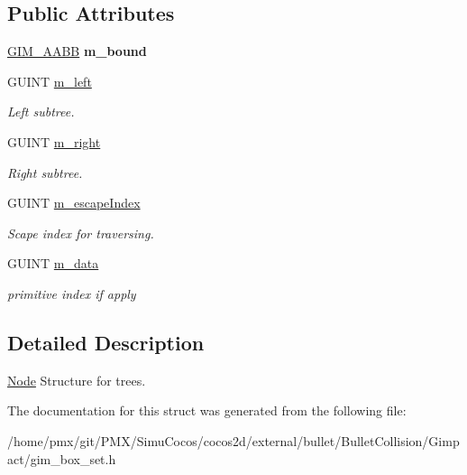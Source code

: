\subsection*{Public Attributes}
\begin{DoxyCompactItemize}
\item 
\mbox{\label{structGIM__BOX__TREE__NODE_aecef473aea92955c329bc0868857a1c6}} 
\hyperlink{classGIM__AABB}{G\+I\+M\+\_\+\+A\+A\+BB} {\bfseries m\+\_\+bound}
\item 
\mbox{\label{structGIM__BOX__TREE__NODE_a6714d74e7c3f7b51c5fdd06e7b93721a}} 
G\+U\+I\+NT \hyperlink{structGIM__BOX__TREE__NODE_a6714d74e7c3f7b51c5fdd06e7b93721a}{m\+\_\+left}
\begin{DoxyCompactList}\small\item\em Left subtree. \end{DoxyCompactList}\item 
\mbox{\label{structGIM__BOX__TREE__NODE_a6ee254a3c0101d107a45ea9add325723}} 
G\+U\+I\+NT \hyperlink{structGIM__BOX__TREE__NODE_a6ee254a3c0101d107a45ea9add325723}{m\+\_\+right}
\begin{DoxyCompactList}\small\item\em Right subtree. \end{DoxyCompactList}\item 
\mbox{\label{structGIM__BOX__TREE__NODE_a5a112d2bd3fcfb2699964f94d1fcfbcd}} 
G\+U\+I\+NT \hyperlink{structGIM__BOX__TREE__NODE_a5a112d2bd3fcfb2699964f94d1fcfbcd}{m\+\_\+escape\+Index}
\begin{DoxyCompactList}\small\item\em Scape index for traversing. \end{DoxyCompactList}\item 
\mbox{\label{structGIM__BOX__TREE__NODE_abba76fb81b6f50d11a0dccec69d0feec}} 
G\+U\+I\+NT \hyperlink{structGIM__BOX__TREE__NODE_abba76fb81b6f50d11a0dccec69d0feec}{m\+\_\+data}
\begin{DoxyCompactList}\small\item\em primitive index if apply \end{DoxyCompactList}\end{DoxyCompactItemize}


\subsection{Detailed Description}
\hyperlink{classNode}{Node} Structure for trees. 

The documentation for this struct was generated from the following file\+:\begin{DoxyCompactItemize}
\item 
/home/pmx/git/\+P\+M\+X/\+Simu\+Cocos/cocos2d/external/bullet/\+Bullet\+Collision/\+Gimpact/gim\+\_\+box\+\_\+set.\+h\end{DoxyCompactItemize}
